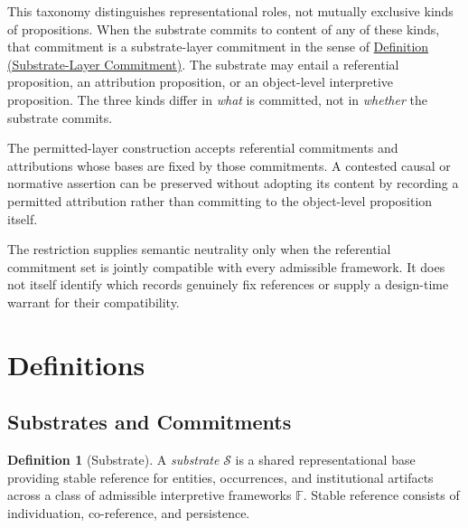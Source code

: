 \documentclass[11pt]{article}
\theoremstyle{plain}
\theoremstyle{definition}
\newtheorem{definition}[theorem]{Definition}
\theoremstyle{remark}
\newcommand{\DefRef}[2]{\hyperref[#1]{Definition (#2)}}
\newcommand{\Substrate}{\mathcal{S}}
\newcommand{\Frameworks}{\mathbb{F}}
\begin{document}
This taxonomy distinguishes representational roles,
not mutually exclusive kinds of propositions.
When the substrate commits to content of any of these kinds,
that commitment is a substrate-layer commitment in the sense of
\DefRef{se100.def.SubstrateCommitment}{Substrate-Layer Commitment}.
The substrate may entail a referential proposition,
an attribution proposition,
or an object-level interpretive proposition.
The three kinds differ in \emph{what} is committed,
not in \emph{whether} the substrate commits.

The permitted-layer construction accepts referential commitments and
attributions whose bases are fixed by those commitments.
A contested causal or normative assertion can be preserved without adopting
its content by recording a permitted attribution rather than committing
to the object-level proposition itself.

The restriction supplies semantic neutrality only when the referential
commitment set is jointly compatible with every admissible framework.
It does not itself identify which records genuinely fix references
or supply a design-time warrant for their compatibility.

\section{Definitions}
\label{sec:definitions}

\subsection*{Substrates and Commitments}

\begin{definition}[Substrate]
  \label{se100.def.Substrate}
  A \emph{substrate} $\Substrate$ is a shared representational base providing
  stable reference for entities, occurrences, and institutional artifacts
  across a class of admissible interpretive frameworks $\Frameworks$.
  Stable reference consists of individuation, co-reference, and persistence.
\end{definition}
\end{document}
